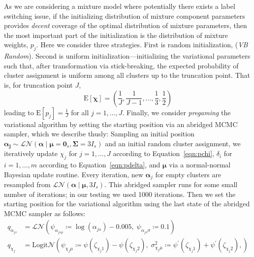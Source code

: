 
As we are considering a mixture model where potentially there exists a label switching
    issue, if the initializing distribution of mixture component parameters provides
    \emph{decent} coverage of the optimal distribution of mixture parameters, then the most 
    important part of the initialization is the distribution of mixture weights, $p_j$.  
    Here we consider three strategies.  First is random initialization,
    (\emph{VB Random}).  Second is uniform initialization---initializing the variational 
    parameters such that, after transformation via stick-breaking, the expected probability 
    of cluster assignment is uniform among all clusters up to the truncation point. That 
    is, for truncation point $J$,
    \[
        \text{E}[\bm{\chi}] = 
            \left(\frac{1}{J},\frac{1}{J-1},\ldots,\frac{1}{3},\frac{1}{2}\right)
    \]
    leading to $\text{E}[p_j] = \frac{1}{J}$ for all $j = 1,\ldots,J$.
    Finally, we consider \emph{pregaming} the variational algorithm by setting the starting 
    position via an abridged MCMC sampler, which we describe thusly:
    Sampling an initial position $\bm{\alpha_j} \sim 
        \mathcal{LN}(\bm{\alpha}\mid\bm{\mu} = \bm{0}_s,\bm{\Sigma} = 3I_s)$ and an
    initial random cluster assignment, we iteratively update $\chi_j$ for $j = 1,\ldots,J$
    according to Equation~\ref{eqn:pchi}, $\delta_i$ for $i = 1,\ldots,m$ according to
    Equation~\ref{eqn:pdelta}, and $\bm{\mu}$ via a normal-normal Bayesian update routine.
    Every iteration, new $\bm{\alpha}_j$ for empty clusters are resampled from 
    $\mathcal{LN}(\bm{\alpha}\mid\bm{\mu}, 3I_s)$.  
    This abridged sampler runs for some small number of iterations; in
    our testing we used 1000 iterations.  Then we set the starting position for the variational
    algorithm using the last state of the abridged MCMC sampler as follows:
    \begin{equation}
        \begin{aligned}
        q_{\alpha_{js}} &= 
            \mathcal{LN}\left(\psi_{\alpha_{js\mu}} \coloneqq\log(\alpha_{js}) - 0.005,\; 
                \psi_{\alpha_{js}\sigma} \coloneqq0.1\right)\\
        q_{\chi_j} &= \text{Logit}\mathcal{N}\left(
        \psi_{\chi_j\mu} \coloneqq\psi(\zeta_{\chi_j 1}) - \psi(\zeta_{\chi_j 2}), \;
            \sigma_{\chi_j\mu}^2 \coloneqq\psi^{\prime}(\zeta_{\chi_j 1}) +
                \psi^{\prime}(\zeta_{\chi_j 2}),
            \right)
        \end{aligned}    
    \end{equation}

